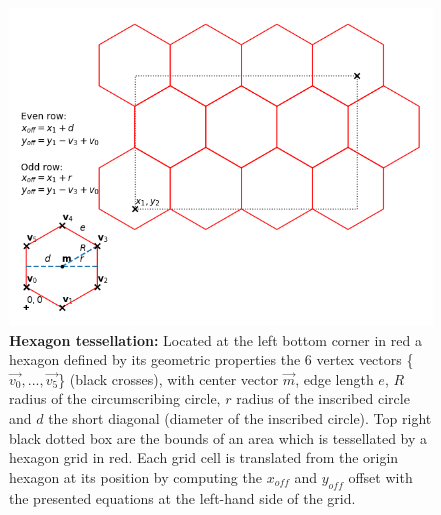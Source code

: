 		\begin{figure}[ht]
			\centering
			\includegraphics[scale=.66]{img/hexagons}
			\caption[Hexagon tessellation]{\textbf{Hexagon tessellation:} Located at the left bottom corner in red a hexagon defined by its geometric properties the 6 vertex vectors \{$\vec{v_0},...,\vec{v_5}$\} (black crosses), with center vector $\vec{m}$, edge length $e$, $R$ radius of the circumscribing circle, $r$ radius of the inscribed circle and $d$ the short diagonal (diameter of the inscribed circle). Top right black dotted box are the bounds of an area which is tessellated by a hexagon grid in red. Each grid cell is translated from the origin hexagon at its position by computing the $x_{off}$ and $y_{off}$ offset with the presented equations at the left-hand side of the grid. }
			\label{fig:hexagon}
		\end{figure}


